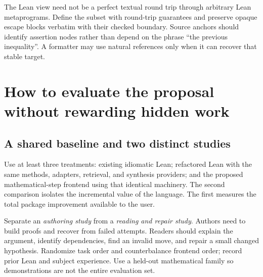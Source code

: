 \documentclass[11pt,letterpaper]{article}
\begin{document}
The Lean view need not be a perfect textual round trip through arbitrary Lean
metaprograms. Define the subset with round-trip guarantees and preserve opaque
escape blocks verbatim with their checked boundary. Source anchors should identify
assertion nodes rather than depend on the phrase ``the previous inequality''.
A formatter may use natural references only when it can recover that stable target.

\section{How to evaluate the proposal without rewarding hidden work}\label{sec:evaluation}
\subsection{A shared baseline and two distinct studies}
Use at least three treatments: existing idiomatic Lean; refactored Lean with the
same methods, adapters, retrieval, and synthesis providers; and the proposed
mathematical-step frontend using that identical machinery. The second comparison
isolates the incremental value of the language. The first measures the total
package improvement available to the user.

Separate an \emph{authoring study} from a \emph{reading and repair study}. Authors
need to build proofs and recover from failed attempts. Readers should explain the
argument, identify dependencies, find an invalid move, and repair a small changed
hypothesis. Randomize task order and counterbalance frontend order; record prior
Lean and subject experience. Use a held-out mathematical family so demonstrations
are not the entire evaluation set.
\end{document}

